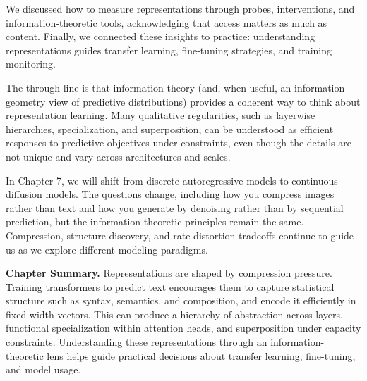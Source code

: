 We discussed how to measure representations through probes, interventions, and information-theoretic tools, acknowledging that access matters as much as content. Finally, we connected these insights to practice: understanding representations guides transfer learning, fine-tuning strategies, and training monitoring.

\vspace{1em}

The through-line is that information theory (and, when useful, an information-geometry view of predictive distributions) provides a coherent way to think about representation learning. Many qualitative regularities, such as layerwise hierarchies, specialization, and superposition, can be understood as efficient responses to predictive objectives under constraints, even though the details are not unique and vary across architectures and scales.

In Chapter 7, we will shift from discrete autoregressive models to continuous diffusion models. The questions change, including how you compress images rather than text and how you generate by denoising rather than by sequential prediction, but the information-theoretic principles remain the same. Compression, structure discovery, and rate-distortion tradeoffs continue to guide us as we explore different modeling paradigms.

\vspace{1em}

\begin{pausebox}
\textbf{Chapter Summary.} Representations are shaped by compression pressure. Training transformers to predict text encourages them to capture statistical structure such as syntax, semantics, and composition, and encode it efficiently in fixed-width vectors. This can produce a hierarchy of abstraction across layers, functional specialization within attention heads, and superposition under capacity constraints. Understanding these representations through an information-theoretic lens helps guide practical decisions about transfer learning, fine-tuning, and model usage.
\end{pausebox}

\vspace{2em}

